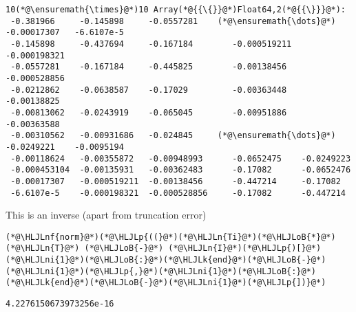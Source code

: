 \documentclass[12pt,a4paper]{article}
\newcommand{\HLJLk}[1]{\textcolor[RGB]{148,91,176}{\textbf{#1}}}
\newcommand{\HLJLn}[1]{#1}
\newcommand{\HLJLnf}[1]{\textcolor[RGB]{66,102,213}{#1}}
\newcommand{\HLJLni}[1]{\textcolor[RGB]{59,151,46}{#1}}
\newcommand{\HLJLoB}[1]{\textcolor[RGB]{102,102,102}{\textbf{#1}}}
\newcommand{\HLJLp}[1]{#1}
\begin{document}
\begin{lstlisting}
10(*@\ensuremath{\times}@*)10 Array(*@{{\{}}@*)Float64,2(*@{{\}}}@*):
 -0.381966     -0.145898     -0.0557281    (*@\ensuremath{\dots}@*)  -0.00017307   -6.6107e-5  
 -0.145898     -0.437694     -0.167184        -0.000519211  -0.000198321
 -0.0557281    -0.167184     -0.445825        -0.00138456   -0.000528856
 -0.0212862    -0.0638587    -0.17029         -0.00363448   -0.00138825 
 -0.00813062   -0.0243919    -0.065045        -0.00951886   -0.00363588 
 -0.00310562   -0.00931686   -0.024845     (*@\ensuremath{\dots}@*)  -0.0249221    -0.0095194  
 -0.00118624   -0.00355872   -0.00948993      -0.0652475    -0.0249223  
 -0.000453104  -0.00135931   -0.00362483      -0.17082      -0.0652476  
 -0.00017307   -0.000519211  -0.00138456      -0.447214     -0.17082    
 -6.6107e-5    -0.000198321  -0.000528856     -0.17082      -0.447214
\end{lstlisting}


This is an inverse (apart from truncation error)


\begin{lstlisting}
(*@\HLJLnf{norm}@*)(*@\HLJLp{((}@*)(*@\HLJLn{Ti}@*)(*@\HLJLoB{*}@*)(*@\HLJLn{T}@*) (*@\HLJLoB{-}@*) (*@\HLJLn{I}@*)(*@\HLJLp{)[}@*)(*@\HLJLni{1}@*)(*@\HLJLoB{:}@*)(*@\HLJLk{end}@*)(*@\HLJLoB{-}@*)(*@\HLJLni{1}@*)(*@\HLJLp{,}@*)(*@\HLJLni{1}@*)(*@\HLJLoB{:}@*)(*@\HLJLk{end}@*)(*@\HLJLoB{-}@*)(*@\HLJLni{1}@*)(*@\HLJLp{])}@*)
\end{lstlisting}

\begin{lstlisting}
4.2276150673973256e-16
\end{lstlisting}
\end{document}
